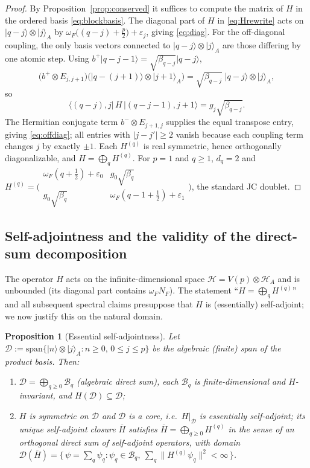 \documentclass[12pt]{article}
\newtheorem{proposition}{Proposition}
\theoremstyle{definition}
\theoremstyle{remark}
\newcommand{\ket}[1]{\lvert #1\rangle}
\newcommand{\bp}{b^{+}}
\newcommand{\bm}{b^{-}}
\newcommand{\HA}{\mathcal{H}_A}
\begin{document}
\begin{proof}
By Proposition~\ref{prop:conserved} it suffices to compute the matrix of $H$ in the
ordered basis \eqref{eq:blockbasis}. The diagonal part of $H$ in
\eqref{eq:Hrewrite} acts on $\ket{q-j}\otimes\ket j_A$ by
$\omega_F\bigl((q-j)+\frac p2\bigr)+\varepsilon_j$, giving \eqref{eq:diag}. For the
off-diagonal coupling, the only basis vectors connected to $\ket{q-j}\otimes\ket j_A$
are those differing by one atomic step. Using
$\bp\ket{q-j-1}=\sqrt{\beta_{q-j}}\ket{q-j}$,
\[
\bigl(\bp\otimes E_{j,j+1}\bigr)\bigl(\ket{q-(j+1)}\otimes\ket{j+1}_A\bigr)
=\sqrt{\beta_{q-j}}\;\ket{q-j}\otimes\ket{j}_A ,
\]
so
\[
\bigl\langle (q-j),j\bigl|\,H\,\bigr|(q-j-1),j+1\bigr\rangle
=g_j\sqrt{\beta_{q-j}} .
\]
The Hermitian conjugate term $\bm\otimes E_{j+1,j}$ supplies the equal transpose
entry, giving \eqref{eq:offdiag}; all entries with $|j-j'|\ge2$ vanish because each
coupling term changes $j$ by exactly $\pm1$. Each $H^{(q)}$ is real symmetric, hence
orthogonally diagonalizable, and $H=\bigoplus_q H^{(q)}$. For $p=1$ and $q\ge1$,
$d_q=2$ and $H^{(q)}=\bigl(\begin{smallmatrix}\omega_F(q+\frac12)+\varepsilon_0 & g_0\sqrt{\beta_q}\\ g_0\sqrt{\beta_q} & \omega_F(q-1+\frac12)+\varepsilon_1\end{smallmatrix}\bigr)$,
the standard JC doublet.
\end{proof}

\subsection{Self-adjointness and the validity of the direct-sum decomposition}
\label{sec:selfadjoint}

The operator $H$ acts on the infinite-dimensional space $\mathcal H=V(p)\otimes\HA$
and is unbounded (its diagonal part contains $\omega_F N_F$). The statement
``$H=\bigoplus_q H^{(q)}$'' and all subsequent spectral claims presuppose that $H$ is
(essentially) self-adjoint; we now justify this on the natural domain.

\begin{proposition}[Essential self-adjointness]\label{prop:esa}
Let $\mathcal D:=\mathrm{span}\{\ket n\otimes\ket j_A:n\ge0,\,0\le j\le p\}$ be the
algebraic (finite) span of the product basis. Then:
\begin{enumerate}
\item $\mathcal D=\bigoplus_{q\ge0}\mathcal B_q$ (algebraic direct sum), each
$\mathcal B_q$ is finite-dimensional and $H$-invariant, and $H(\mathcal D)\subseteq\mathcal D$;
\item $H$ is symmetric on $\mathcal D$ and $\mathcal D$ is a core, i.e.\ $H|_{\mathcal D}$
is essentially self-adjoint; its unique self-adjoint closure $\overline H$ satisfies
$\overline H=\bigoplus_{q\ge0}H^{(q)}$ in the sense of an orthogonal direct sum of
self-adjoint operators, with domain
$\mathcal{D}(\overline H)=\{\,\psi=\sum_q\psi_q:\psi_q\in\mathcal B_q,\ \sum_q\|H^{(q)}\psi_q\|^2<\infty\,\}$.
\end{enumerate}
\end{proposition}
\end{document}
